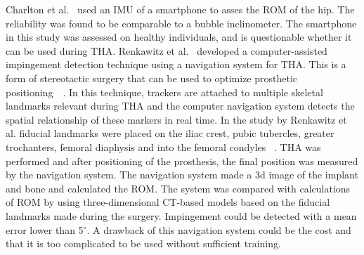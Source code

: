 \documentclass[whitelogo]{tudelft-report}
\begin{document}
{Charlton et al.~\cite{charlton2015reliability} used an IMU of a smartphone to asses the ROM of the hip. The reliability was found to be comparable to a bubble inclinometer. The smartphone in this study was assessed on healthy individuals, and is questionable  whether it can be used during THA. Renkawitz et al.~\cite{renkawitz2012development} developed a computer-assisted impingement detection technique using a navigation system for THA. This is a form of stereotactic surgery that can be used to optimize prosthetic positioning~\cite{kelley2009role}~\cite{renkawitz2009computer}. In this technique, trackers are attached to multiple skeletal landmarks relevant during THA and the computer navigation system detects the spatial relationship of these markers in real time. In the study by Renkawitz et al. fiducial landmarks were placed on the iliac crest, pubic tubercles, greater trochanters, femoral diaphysis and into the femoral condyles ~\cite{renkawitz2012development}. THA was performed and after positioning of the prosthesis, the final position was measured by the navigation system. The navigation system made a 3d image of the implant and bone and calculated the ROM. The system was compared with calculations of ROM by using three-dimensional CT-based models based on the fiducial landmarks made during the surgery. Impingement could be detected with a mean error lower than 5$^\circ$. A drawback of this navigation system could be the cost and that it is too complicated to be used without sufficient training.
	
}
\end{document}
